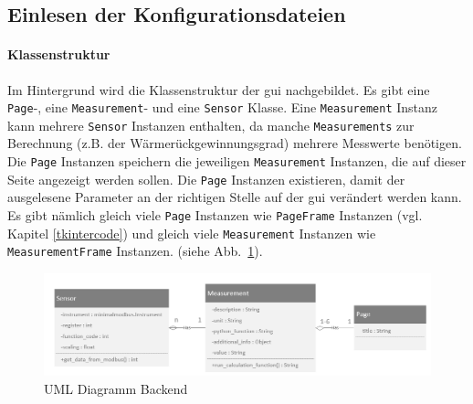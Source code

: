 \subsection{Einlesen der Konfigurationsdateien} \label{einlesen_konfigurationsdateien}
\paragraph{Klassenstruktur}
Im Hintergrund wird die Klassenstruktur der \ac{gui} nachgebildet. Es gibt eine \lstinline{Page}-, eine \lstinline{Measurement}- und eine \lstinline{Sensor} Klasse. Eine \lstinline{Measurement} Instanz kann mehrere \lstinline{Sensor} Instanzen enthalten, da manche \lstinline{Measurements} zur Berechnung (z.B. der Wärmerückgewinnungsgrad) mehrere Messwerte benötigen. Die \lstinline{Page} Instanzen speichern die jeweiligen \lstinline{Measurement} Instanzen, die auf dieser Seite angezeigt werden sollen. Die \lstinline{Page} Instanzen existieren, damit der ausgelesene Parameter an der richtigen Stelle auf der \acs{gui} verändert werden kann. Es gibt nämlich gleich viele \lstinline{Page} Instanzen wie \lstinline{PageFrame} Instanzen (vgl. Kapitel \ref{tkintercode}) und gleich viele \lstinline{Measurement} Instanzen wie \lstinline{MeasurementFrame} Instanzen. (siehe Abb.~\ref{fig:uml_backend}).
\begin{figure}[ht]
	\centering
	\includegraphics[width=1.0\linewidth]{Bilder/UML_Backend}
	\caption{UML Diagramm Backend}
	\label{fig:uml_backend}
\end{figure}

